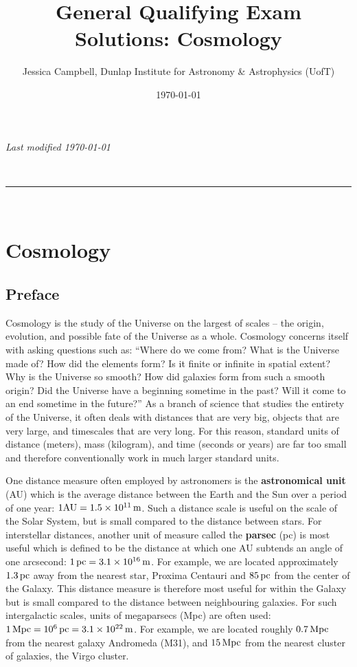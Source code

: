 \documentclass[a4paper,11pt]{article}
\makeatletter
\newcommand{\linia}{\rule{\linewidth}{0.5pt}}
\renewcommand{\maketitle}{
\begin{center}
\vspace{2ex}
{\huge \textsc{\@title}}
\vspace{1ex}
\\
\linia\\
\@author
\vspace{4ex}
\end{center}
}
\makeatother
\begin{document}
\hfill{\textit{Last modified \today}}
\title{General Qualifying Exam Solutions: Cosmology}
\author{Jessica Campbell, Dunlap Institute for Astronomy \& Astrophysics (UofT)}
\date{\today}
\maketitle

\tableofcontents


%
%
%
%

\newpage
\section{Cosmology}

\subsection{Preface}
Cosmology is the study of the Universe on the largest of scales -- the origin, evolution, and possible fate of the Universe as a whole. Cosmology concerns itself with asking questions such as: ``Where do we come from? What is the Universe made of? How did the elements form? Is it finite or infinite in spatial extent? Why is the Universe so smooth? How did galaxies form from such a smooth origin? Did the Universe have a beginning sometime in the past? Will it come to an end sometime in the future?'' As a branch of science that studies the entirety of the Universe, it often deals with distances that are very big, objects that are very large, and timescales that are very long. For this reason, standard units of distance (meters), mass (kilogram), and time (seconds or years) are far too small and therefore conventionally work in much larger standard units.

One distance measure often employed by astronomers is the \textbf{astronomical unit} (AU) which is the average distance between the Earth and the Sun over a period of one year: $1 {\rm AU} = 1.5 \times 10^{11}\,{\rm m}$. Such a distance scale is useful on the scale of the Solar System, but is small compared to the distance between stars. For interstellar distances, another unit of measure called the \textbf{parsec} (pc) is most useful which is defined to be the distance at which one AU subtends an angle of one arcsecond: $1\,{\rm pc} = 3.1\times10^{16}\,{\rm m}$. For example, we are located approximately $1.3\,{\rm pc}$ away from the nearest star, Proxima Centauri and $85\,{\rm pc}$ from the center of the Galaxy. This distance measure is therefore most useful for within the Galaxy but is small compared to the distance between neighbouring galaxies. For such intergalactic scales, units of megaparsecs (Mpc) are often used: $1\,{\rm Mpc} = 10^6\,{\rm pc} = 3.1\times10^{22}\,{\rm m}$. For example, we are located roughly $0.7\,{\rm Mpc}$ from the nearest galaxy Andromeda (M31), and $15\,{\rm Mpc}$ from the nearest cluster of galaxies, the Virgo cluster.
\end{document}
